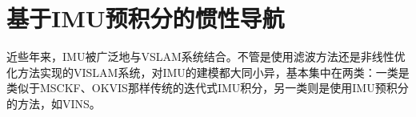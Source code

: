 \chapter{基于IMU预积分的惯性导航}\label{ch:vislam}

近些年来，IMU被广泛地与VSLAM系统结合。不管是使用滤波方法还是非线性优化方法实现的VISLAM系统，对IMU的建模都大同小异，基本集中在两类：一类是类似于MSCKF\citep{mourikis2007multi}、OKVIS\citep{leutenegger2015keyframe}那样传统的迭代式IMU积分，另一类则是使用IMU预积分\citep{forster2017manifold}的方法，如VINS\citep{li2017monocular}。


